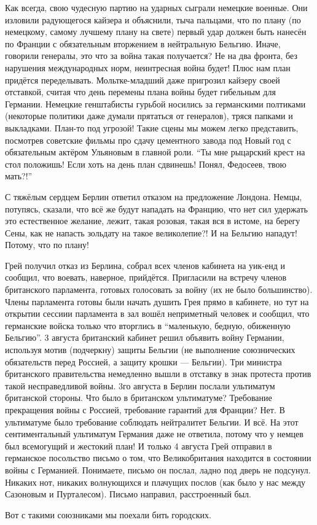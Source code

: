 Как всегда, свою чудесную партию на ударных сыграли не\-мец\-кие военные. Они
изловили радующегося кайзера и объяснили, тыча пальцами, что по плану (по
немецкому, самому лучшему плану на свете) первый удар должен быть нанесён по
Франции с обязательным вторжением в нейтральную Бельгию. Иначе, говорили
генералы, это что за война такая получается? Не на два фронта, без нарушения
международных норм, неинтресная война будет! Плюс нам план придётся
переделывать. Мольтке-младший даже пригрозил кайзеру своей отставкой, считая
что день перемены плана войны будет гибельным для Германии. Немецкие
генштабисты гурьбой носились за германскими полтиками (некоторые политики даже
думали прятаться от генералов), тряся папками и выкладками. План-то под угрозой!
Такие сцены мы можем легко представить, посмотрев советские фильмы про сдачу
цементного завода под Новый год с обязательным актёром Ульяновым в главной роли.
\enquote{Ты мне рыцарский крест на стол положишь! Если хоть на день план
сдвинешь! Понял, Федосеев, твою мать?!}

С тяжёлым сердцем Берлин ответил отказом на предложение Лондона. Немцы,
потупясь, сказали, что всё же будут нападать на Францию, что нет сил удержать
это естественное желание, лежит, такая розовая, такая вся в истоме, на берегу
Сены, как не напасть зольдату на такое великолепие?! И на Бельгию нападут!
Потому, что по плану!

Грей получил отказ из Берлина, собрал всех членов кабинета на уик-енд и сообщил,
что воевать, наверное, прийдётся. Пригласили на встречу членов британского
парламента, готовых голосовать за войну (их не было большинство). Члены
парламента готовы были начать душить Грея прямо в кабинете, но тут на открытии
сессиии парламента в зал вошёл неприметный человек и сообщил, что германские
войска только что вторглись в \enquote{маленькую, бедную, обиженную Бельгию}.
3 августа британский кабинет решил объявить войну Германии, используя мотив
(подчеркну) защиты Бельгии (не выполнение союзнических обязательств перед
Россией, а защиту крошки --- Бельгии). Три министра британского правительства
немедленно вышли в отставку в знак протеста против такой несправедливой войны.
3го августа в Берлин послали ультиматум британской стороны. Что было в
британском ультиматуме? Требование прекращения войны с Россией, требование
гарантий для Франции? Нет. В ультиматуме было требование соблюдать нейтралитет
Бельгии. И всё. На этот сентиментальный ультиматум Германия даже не ответила,
потому что у немцев был всемогущий и жестокий план! И только 4 августа Грей
отправил в германское посольство письмо о том, что Великобритания находится в
состоянии войны с Германией. Понимаете, письмо он послал, ладно под дверь не
подсунул. Никаких нот, никаких волнующихся и плачущих послов (как было у нас
между Сазоновым и Пурталесом). Письмо направил, расстроенный был.

Вот с такими союзниками мы поехали бить городских.
